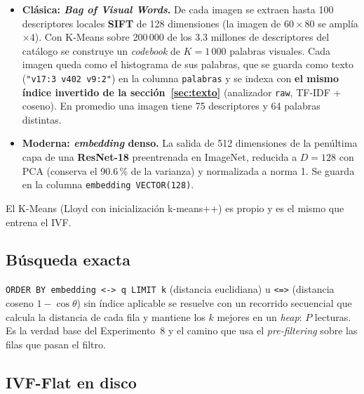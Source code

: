 \documentclass[11pt,a4paper]{article}
\newcommand{\code}[1]{\texttt{#1}}
\begin{document}
\begin{itemize}
\item \textbf{Clásica: \emph{Bag of Visual Words}.} De cada imagen se extraen hasta 100 descriptores
  locales \textbf{SIFT} de 128 dimensiones (la imagen de $60\times80$ se amplía $\times4$). Con
  K-Means sobre 200\,000 de los 3.3 millones de descriptores del catálogo se construye un
  \emph{codebook} de $K=1\,000$ palabras visuales. Cada imagen queda como el histograma de sus
  palabras, que se guarda como texto (\code{"v17:3 v402 v9:2"}) en la columna \code{palabras} y se
  indexa con \textbf{el mismo índice invertido de la sección~\ref{sec:texto}} (analizador \code{raw},
  TF-IDF + coseno). En promedio una imagen tiene 75 descriptores y 64 palabras distintas.
\item \textbf{Moderna: \emph{embedding} denso.} La salida de 512 dimensiones de la penúltima capa de
  una \textbf{ResNet-18} preentrenada en ImageNet, reducida a $D=128$ con PCA (conserva el 90.6\,\% de
  la varianza) y normalizada a norma 1. Se guarda en la columna \code{embedding VECTOR(128)}.
\end{itemize}

El K-Means (Lloyd con inicialización k-means++) es propio y es el mismo que entrena el IVF.

\subsection{Búsqueda exacta}

\code{ORDER BY embedding <-> q LIMIT k} (distancia euclidiana) u \code{<=>} (distancia coseno
$1-\cos\theta$) sin índice aplicable se resuelve con un recorrido secuencial que calcula la distancia
de cada fila y mantiene los $k$ mejores en un \emph{heap}: $P$ lecturas. Es la verdad base del
Experimento~8 y el camino que usa el \emph{pre-filtering} sobre las filas que pasan el filtro.

\subsection{IVF-Flat en disco}
\end{document}
